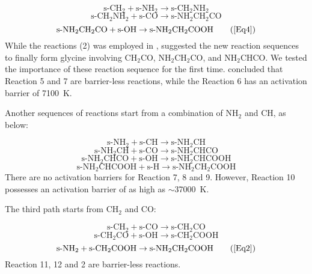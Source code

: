 \documentclass{aastex61}
\begin{document}
\begin{itemize}
\begin{equation}
\mbox{s-CH}_2+ \mbox{s-NH}_2 \rightarrow  \mbox{s-CH}_2\mbox{NH}_2
\label{Eq5}
\end{equation}
\begin{equation}
\mbox{s-CH}_2\mbox{NH}_2  + \mbox{s-CO} \rightarrow  \mbox{s-NH}_2\mbox{CH}_2\mbox{CO}
\label{Eq6}
\end{equation}
\begin{equation}
\mbox{s-NH}_2\mbox{CH}_2\mbox{CO} + \mbox{s-OH}  \rightarrow  \mbox{s-NH}_2\mbox{CH}_2\mbox{COOH}
\tag{\ref{Eq4}}
\end{equation}
While the reactions (2) was employed in \cite{Garrod13}, \cite{Singh13} suggested the new reaction sequences to finally form glycine involving CH$_2$CO, NH$_2$CH$_2$CO, and NH$_2$CHCO. 
%
We tested the importance of these reaction sequence for the first time.
%
\cite{Singh13} concluded that Reaction 5 and 7 are barrier-less reactions, while the Reaction 6 has an activation barrier of 7100~K. 

Another sequences of reactions start from a combination of NH$_2$ and CH, as below:

\begin{equation}
\mbox{s-NH}_2+ \mbox{s-CH} \rightarrow  \mbox{s-NH}_2\mbox{CH}
\label{Eq7}
\end{equation}
\begin{equation}
  \mbox{s-NH}_2\mbox{CH} + \mbox{s-CO} \rightarrow  \mbox{s-NH}_2\mbox{CH}\mbox{CO}
\label{Eq8}
\end{equation}
\begin{equation}
\mbox{s-NH}_2\mbox{CH}\mbox{CO} + \mbox{s-OH}  \rightarrow  \mbox{s-NH}_2\mbox{CH}\mbox{COOH}
\label{Eq9}
\end{equation}
\begin{equation}
\mbox{s-NH}_2\mbox{CH}\mbox{COOH} + \mbox{s-H}  \rightarrow  \mbox{s-NH}_2\mbox{CH}_2\mbox{COOH}
\label{Eq10}
\end{equation}
There are no activation barriers for Reaction 7, 8 and 9. However, Reaction 10 possesses an activation barrier of as high as $\sim$37000~K.

The third path starts from CH$_2$ and CO:

\begin{equation}
\mbox{s-CH}_2+ \mbox{s-CO} \rightarrow  \mbox{s-CH}_2\mbox{CO}
\label{Eq11}
\end{equation}
\begin{equation}
\mbox{s-CH}_2\mbox{CO}  + \mbox{s-OH} \rightarrow  \mbox{s-CH}_2\mbox{COOH}
\label{Eq12}
\end{equation}
\begin{equation}
\mbox{s-NH}_2 + \mbox{s-CH}_2\mbox{COOH} \rightarrow  \mbox{s-NH}_2\mbox{CH}_2\mbox{COOH}
\tag{\ref{Eq2}}
\end{equation}
Reaction 11, 12  and 2 are barrier-less reactions.


\end{itemize}
\end{document}
